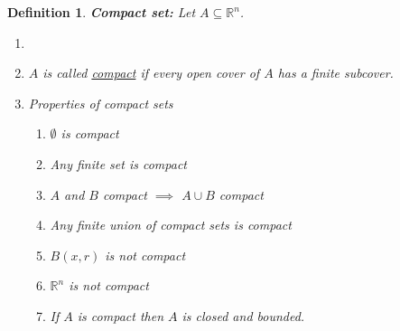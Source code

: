 \documentclass[]{article}
\newcommand{\R}{\mathbb{R}}
\newtheorem{definition}{Definition}
\begin{document}
\begin{definition}
    \emph{\textbf{Compact set:}} 
    Let $A \subseteq \R^n$. 
    \begin{enumerate}
        \item 
        \item $A$ is called \emph{\underline{compact}} if every open cover of $A$ has a finite subcover.
        \item Properties of compact sets \begin{enumerate}
            \item $\emptyset$ is compact
            \item Any finite set is compact
            \item $A$ and $B$ compact $\implies$ $A \cup B$ compact
            \item Any finite union of compact sets is compact
            \item $B(x,r)$ is not compact
            \item $\R^n$ is not compact
            \item If $A$ is compact then $A$ is closed and bounded.
        \end{enumerate}
    \end{enumerate}
\end{definition}
\end{document}
